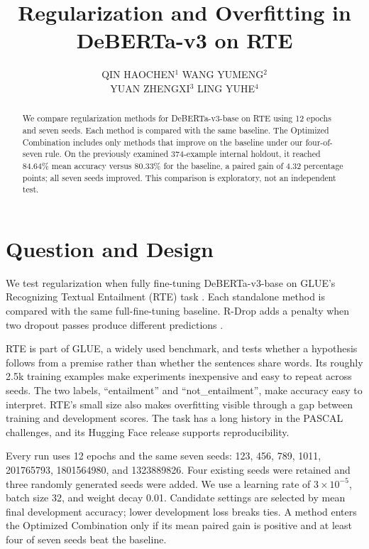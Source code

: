 \documentclass[letterpaper]{article}
\title{Regularization and Overfitting in DeBERTa-v3 on RTE}
\author{QIN HAOCHEN$^{1}$ \quad WANG YUMENG$^{2}$\\
YUAN ZHENGXI$^{3}$ \quad LING YUHE$^{4}$}
\begin{document}
\maketitle

\begin{abstract}
We compare regularization methods for DeBERTa-v3-base on RTE using 12 epochs and seven seeds. Each method is compared with the same baseline. The Optimized Combination includes only methods that improve on the baseline under our four-of-seven rule. On the previously examined 374-example internal holdout, it reached 84.64\% mean accuracy versus 80.33\% for the baseline, a paired gain of 4.32 percentage points; all seven seeds improved. This comparison is exploratory, not an independent test.
\end{abstract}

\section{Question and Design}
We test regularization when fully fine-tuning DeBERTa-v3-base on GLUE's Recognizing Textual Entailment (RTE) task \cite{deberta,glue}. Each standalone method is compared with the same full-fine-tuning baseline. R-Drop adds a penalty when two dropout passes produce different predictions \cite{rdrop}.

RTE is part of GLUE, a widely used benchmark, and tests whether a hypothesis follows from a premise rather than whether the sentences share words. Its roughly 2.5k training examples make experiments inexpensive and easy to repeat across seeds. The two labels, ``entailment'' and ``not\_entailment'', make accuracy easy to interpret. RTE's small size also makes overfitting visible through a gap between training and development scores. The task has a long history in the PASCAL challenges, and its Hugging Face release supports reproducibility.

Every run uses 12 epochs and the same seven seeds: 123, 456, 789, 1011, 201765793, 1801564980, and 1323889826. Four existing seeds were retained and three randomly generated seeds were added. We use a learning rate of $3\times10^{-5}$, batch size 32, and weight decay 0.01. Candidate settings are selected by mean final development accuracy; lower development loss breaks ties. A method enters the Optimized Combination only if its mean paired gain is positive and at least four of seven seeds beat the baseline.
\end{document}
